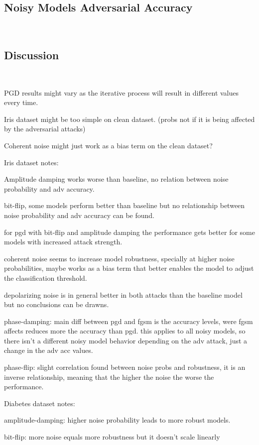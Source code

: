 \subsection{Noisy Models Adversarial Accuracy}\label{subsection:plus-minus-noisy-adv-acc} \

\subsection{Discussion}\label{subsection:discussion} \

PGD results might vary as the iterative process will result in different
values every time. \

Iris dataset might be too simple on clean dataset. (probs not if it is being affected by the adversarial attacks)

Coherent noise might just work as a bias term on the clean dataset? \

Iris dataset notes: \

Amplitude damping works worse than baseline, no relation between noise
probability and adv accuracy. \

bit-flip, some models perform better than baseline but no relationship
between noise probability and adv accuracy can be found. \

for pgd with bit-flip and amplitude damping the performance gets better
for some models with increased attack strength. \

coherent noise seems to increase model robustness, specially at higher noise
probabilities, maybe works as a bias term that better enables the model
to adjust the classification threshold. \

depolarizing noise is in general better in both attacks than the baseline
model but no conclusions can be drawns. \

phase-damping: main diff between pgd and fgsm is the accuracy levels,
were fgsm affects reduces more the accuracy than pgd. this applies to
all noisy models, so there isn't a different noisy model behavior
depending on the adv attack, just a change in the adv acc values. \

phase-flip: slight correlation found between noise probs and robustness,
it is an inverse relationship, meaning that the higher the noise the worse
the performance.

Diabetes dataset notes: \

amplitude-damping: higher noise probability leads to more robust models. \

bit-flip: more noise equals more robustness but it doesn't scale linearly \


